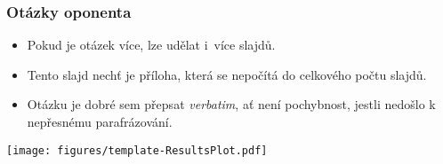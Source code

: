  
  
  
  
  
  \appendix{}
  \begin{frame}
    \frametitle{Otázky oponenta}
    \begin{itemize}
      \item Pokud je otázek více, lze udělat i~více slajdů.
      \item Tento slajd nechť je příloha, která se nepočítá do celkového počtu slajdů.
      \item Otázku je dobré sem přepsat \emph{verbatim}, ať není pochybnost, jestli nedošlo k nepřesnému parafrázování.
    \end{itemize}
    \bigskip
    \texttt{[image: figures/template-ResultsPlot.pdf]}
  \end{frame}